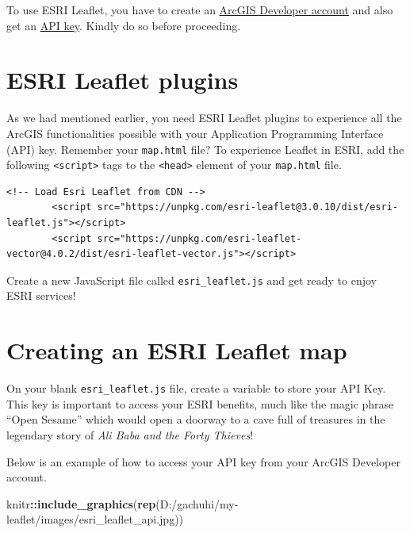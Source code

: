 \documentclass[
]{book}
\newenvironment{Shaded}{\begin{snugshade}}{\end{snugshade}}
\newcommand{\FunctionTok}[1]{\textcolor[rgb]{0.13,0.29,0.53}{\textbf{#1}}}
\newcommand{\NormalTok}[1]{#1}
\newcommand{\SpecialCharTok}[1]{\textcolor[rgb]{0.81,0.36,0.00}{\textbf{#1}}}
\newcommand{\StringTok}[1]{\textcolor[rgb]{0.31,0.60,0.02}{#1}}
\begin{document}
To use ESRI Leaflet, you have to create an \href{https://developers.arcgis.com/dashboard/}{ArcGIS Developer account} and also get an \href{https://developers.arcgis.com/esri-leaflet/authentication/create-an-api-key/}{API key}. Kindly do so before proceeding.

\hypertarget{esri-leaflet-plugins}{%
\section{ESRI Leaflet plugins}\label{esri-leaflet-plugins}}

As we had mentioned earlier, you need ESRI Leaflet plugins to experience all the ArcGIS functionalities possible with your Application Programming Interface (API) key. Remember your \texttt{map.html} file? To experience Leaflet in ESRI, add the following \texttt{\textless{}script\textgreater{}} tags to the \texttt{\textless{}head\textgreater{}} element of your \texttt{map.html} file.

\begin{verbatim}
<!-- Load Esri Leaflet from CDN -->
        <script src="https://unpkg.com/esri-leaflet@3.0.10/dist/esri-leaflet.js"></script>
        <script src="https://unpkg.com/esri-leaflet-vector@4.0.2/dist/esri-leaflet-vector.js"></script>
\end{verbatim}

Create a new JavaScript file called \texttt{esri\_leaflet.js} and get ready to enjoy ESRI services!

\hypertarget{creating-an-esri-leaflet-map}{%
\section{Creating an ESRI Leaflet map}\label{creating-an-esri-leaflet-map}}

On your blank \texttt{esri\_leaflet.js} file, create a variable to store your API Key. This key is important to access your ESRI benefits, much like the magic phrase ``Open Sesame'' which would open a doorway to a cave full of treasures in the legendary story of \emph{Ali Baba and the Forty Thieves}!

Below is an example of how to access your API key from your ArcGIS Developer account.

\begin{Shaded}
\begin{Highlighting}[]
\NormalTok{knitr}\SpecialCharTok{::}\FunctionTok{include\_graphics}\NormalTok{(}\FunctionTok{rep}\NormalTok{(}\StringTok{\textquotesingle{}D:/gachuhi/my{-}leaflet/images/esri\_leaflet\_api.jpg\textquotesingle{}}\NormalTok{))}
\end{Highlighting}
\end{Shaded}
\end{document}
